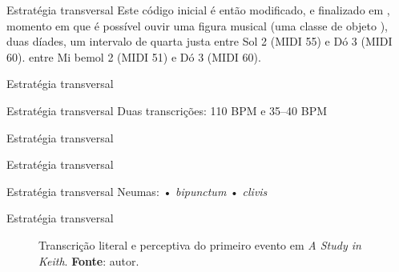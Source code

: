 \documentclass[aspectratio=169]{beamer}
\begin{document}
\begin{frame}{Estratégia transversal}
Este código inicial é então modificado, e finalizado em , momento em que é possível ouvir uma figura musical (uma classe de objeto ), duas díades, um intervalo de quarta justa entre Sol 2 (MIDI 55) e Dó 3 (MIDI 60). entre Mi bemol 2 (MIDI 51) e Dó 3 (MIDI 60).
\end{frame}

\begin{frame}{Estratégia transversal}
\sorensenseis
\end{frame}

\begin{frame}{Estratégia transversal}
Duas transcrições: 110 BPM  e 35--40 BPM 
\end{frame}


\begin{frame}{Estratégia transversal}

\end{frame}

\begin{frame}{Estratégia transversal}
  
\end{frame}

\begin{frame}{Estratégia transversal}
Neumas:
• \emph{bipunctum}
• \emph{clivis}
\end{frame}

\begin{frame}{Estratégia transversal}
\begin{figure}[!h]
  
  \caption{Transcrição literal e perceptiva do primeiro evento em \emph{A Study in Keith}. \textbf{Fonte}: autor.}
  \label{fig:ask1}
\end{figure}
\end{frame}
\end{document}
